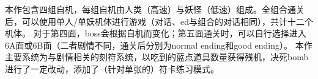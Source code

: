 本作包含四组自机，每组自机由人类（高速）与妖怪（低速）组成。全组合通关后，可以使用单人/单妖机体进行游戏（对话、ed与组合的对话相同），共计十二个机体。
对于第四面，boss会根据自机而变化；第五面通关时，可以自行选择进入6A面或6B面（二者剧情不同，通关后分别为normal ending和good ending）。
本作主要系统为与剧情相关的刻符系统，以吃到的蓝点道具数量获得残机，决死bomb进行了一定改动，添加了（针对单张的）符卡练习模式。